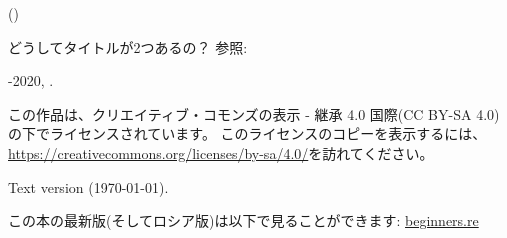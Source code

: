 ﻿\begin{titlepage}


\end{titlepage}

\newpage

\begin{center}
\vspace*{\fill}
{\LARGE \TitleMain}

\bigskip

{\large (\TitleAux)}

\bigskip
\bigskip
どうしてタイトルが2つあるの？ 参照: 

\vspace*{\fill}

{\large \AUTHOR}

{\large \TT{\EMAILPRI}}
\vspace*{\fill}
\vfill

\ccbysa

-2020, \AUTHOR. 

この作品は、クリエイティブ・コモンズの表示 - 継承 4.0 国際(CC BY-SA 4.0)の下でライセンスされています。
このライセンスのコピーを表示するには、\url{https://creativecommons.org/licenses/by-sa/4.0/}を訪れてください。

Text version ({\large \today}).

この本の最新版(そしてロシア版)は以下で見ることができます: \href{http://go.yurichev.com/17009}{beginners.re}

\end{center}

